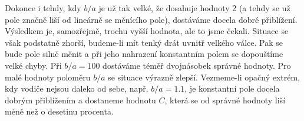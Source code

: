     \begin{table}[ht!]      %
      \centering
     \end{table}

    Dokonce i tehdy, kdy \(b/a\) je už tak velké, že dosahuje hodnoty \num{2} (a tehdy se už pole
    značně liší od lineárně se měnícího pole), dostáváme docela dobré přiblížení. Výsledkem je,
    samozřejmě, trochu vyšší hodnota, ale to jsme čekali. Situace se však podstatně zhorší,
    budeme-li mít tenký drát uvnitř velkého válce. Pak se bude pole silně měnit a při jeho nahrazení
    konstantním polem se dopouštíme velké chyby. Při \(b/a = 100\) dostáváme téměř dvojnásobek
    správné hodnoty. Pro malé hodnoty poloměru \(b/a\) se situace výrazně zlepší. Vezmeme-li opačný
    extrém, kdy vodiče nejsou daleko od sebe, např. \(b/a= \num{1.1}\), je konstantní pole docela
    dobrým přiblížením a dostaneme hodnotu \(C\), která se od správné hodnoty liší méně než o
    desetinu procenta. 
    
